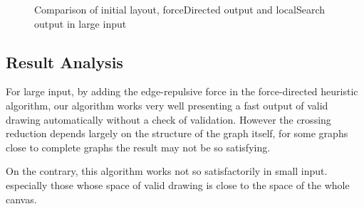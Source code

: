 \documentclass[utf8, a4paper, 12pt]{article}
\begin{document}
\begin{figure}[htbp]
	
	\centering
	\quad
	\quad
	\caption{Comparison of initial layout, forceDirected output and localSearch output in large input}
	\label{all1}
\end{figure}
\newpage
\subsection{Result Analysis}
For large input, by adding the edge-repulsive force in the force-directed heuristic algorithm, our algorithm works very well
presenting a fast output of valid drawing automatically without a check of validation. However the crossing reduction depends largely on the structure of the graph itself, for some graphs close to complete graphs the result may not be so satisfying.

On the contrary, this algorithm works not so satisfactorily in small input. especially those whose space of valid drawing is close to the space of the whole canvas.
\end{document}
